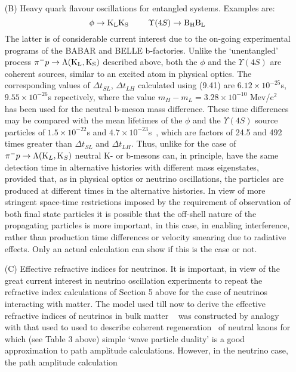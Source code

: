{\begin{itemize}
    \item[(B)] Heavy quark flavour oscillations for entangled systems. Examples are:
   \[ \phi \rightarrow {\rm K_L} {\rm K_S}~~~~~~~\Upsilon(4S) \rightarrow {\rm B_H} {\rm B_L}  \]
      The latter is of considerable current interest due to the on-going 
    experimental programs of the BABAR and BELLE b-factories. Unlike the `unentangled' process
     $\pi^- p \rightarrow \Lambda ({\rm K_L}, {\rm K_S})$ described above, both the $\phi$
   and the $\Upsilon(4S)$ are coherent sources, similar to an excited atom in physical optics.
    The corresponding values of $\Delta t_{SL}$, $\Delta t_{LH}$ calculated using (9.41) 
    are $6.12 \times 10^{-25}$s, $9.55 \times 10^{-26}$s  repectively, where the value
    $m_H-m_L = 3.28 \times 10^{-10}$ Mev/c$^2$~\cite{PDG04} has been used for the neutral
   b-meson mass difference. These time differences may be compared with the mean lifetimes 
   of the $\phi$ and the $\Upsilon(4S)$ source particles of
      $1.5 \times 10^{-22}$s and $4.7 \times 10^{-23}$s~\cite{PDG04}, which are factors 
    of 24.5 and 492 times greater than  $\Delta t_{SL}$ and  $\Delta t_{LH}$. Thus, unlike for the 
    case of  $\pi^- p \rightarrow \Lambda ({\rm K}_L, {\rm K}_S)$ neutral K- or b-mesons
    can, in principle, have the same detection time in alternative histories with different
    mass eigenstates, provided that, as in physical optics or neutrino oscillations, the particles
    are produced at different times in the alternative histories. In view of more stringent
   space-time restrictions imposed by the requirement of observation of both final state particles
   it is possible that the off-shell nature of the propagating particles is more important, in this case, in
   enabling interference, rather than production time differences or velocity smearing due to 
   radiative effects. Only an actual calculation can show if this is the case or not.
  \item[(C)] Effective refractive indices for neutrinos. 
  It is important, in view of the great current interest in neutrino oscillation 
    experiments to repeat the refractive index calculations of Section 5 above for the case of
  neutrinos interacting with matter. The model used till now to derive the effective
   refractive indices of neutrinos in bulk matter ~\cite{Wolfenstein,MS} was constructed
  by analogy with that used to used to describe coherent regeneration~\cite{PP} of neutral kaons
   for which (see Table 3 above) simple `wave particle duality' is a good approximation
   to path amplitude calculations. However, in the neutrino case, the path amplitude calculation

\end{itemize}}
